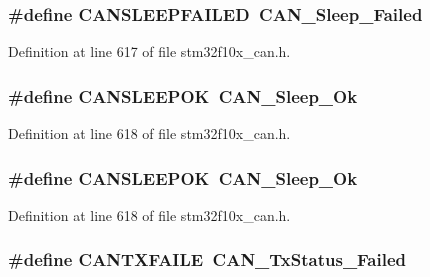 \subsubsection[{\texorpdfstring{C\+A\+N\+S\+L\+E\+E\+P\+F\+A\+I\+L\+ED}{CANSLEEPFAILED}}]{\setlength{\rightskip}{0pt plus 5cm}\#define C\+A\+N\+S\+L\+E\+E\+P\+F\+A\+I\+L\+ED~{\bf C\+A\+N\+\_\+\+Sleep\+\_\+\+Failed}}\hypertarget{group___c_a_n___legacy_ga4d5e8e0c57febb024b30e5f24866a117}{}\label{group___c_a_n___legacy_ga4d5e8e0c57febb024b30e5f24866a117}


Definition at line 617 of file stm32f10x\+\_\+can.\+h.

\subsubsection[{\texorpdfstring{C\+A\+N\+S\+L\+E\+E\+P\+OK}{CANSLEEPOK}}]{\setlength{\rightskip}{0pt plus 5cm}\#define C\+A\+N\+S\+L\+E\+E\+P\+OK~{\bf C\+A\+N\+\_\+\+Sleep\+\_\+\+Ok}}\hypertarget{group___c_a_n___legacy_ga2f8d34f8f60a6c84d8e436d4d37708ab}{}\label{group___c_a_n___legacy_ga2f8d34f8f60a6c84d8e436d4d37708ab}


Definition at line 618 of file stm32f10x\+\_\+can.\+h.

\subsubsection[{\texorpdfstring{C\+A\+N\+S\+L\+E\+E\+P\+OK}{CANSLEEPOK}}]{\setlength{\rightskip}{0pt plus 5cm}\#define C\+A\+N\+S\+L\+E\+E\+P\+OK~{\bf C\+A\+N\+\_\+\+Sleep\+\_\+\+Ok}}\hypertarget{group___c_a_n___legacy_ga2f8d34f8f60a6c84d8e436d4d37708ab}{}\label{group___c_a_n___legacy_ga2f8d34f8f60a6c84d8e436d4d37708ab}


Definition at line 618 of file stm32f10x\+\_\+can.\+h.

\subsubsection[{\texorpdfstring{C\+A\+N\+T\+X\+F\+A\+I\+LE}{CANTXFAILE}}]{\setlength{\rightskip}{0pt plus 5cm}\#define C\+A\+N\+T\+X\+F\+A\+I\+LE~{\bf C\+A\+N\+\_\+\+Tx\+Status\+\_\+\+Failed}}\hypertarget{group___c_a_n___legacy_gae315f7ee14af20ca8454be9e507873cd}{}\label{group___c_a_n___legacy_gae315f7ee14af20ca8454be9e507873cd}


